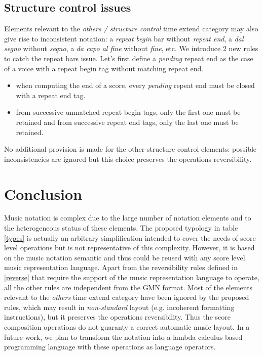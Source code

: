 \documentclass{article}
\begin{document}
\subsection{Structure control issues} \label{sc}
Elements relevant to the \emph{others / structure control} time extend category may also give rise to inconsistent notation: a \emph{repeat begin} bar without \emph{repeat end}, a \emph{dal segno} without \emph{segno}, a \emph{da capo al fine} without \emph{fine}, etc. We introduce 2 new rules to catch the repeat bars issue. Let's first define a \emph{pending} repeat end as the case of a voice with a repeat begin tag without matching repeat end.
\begin{itemize}
\item when computing the end of a score, every \emph{pending} repeat end must be closed with a repeat end tag.
\item from successive unmatched repeat begin tags, only the first one must be retained and from successive repeat end tags, only the last one must be retained.
\end{itemize}
No additional provision is made for the other structure control elements: possible inconsistencies are ignored but this choice preserves the operations reversibility.

\section{Conclusion}
Music notation is complex due to the large number of notation elements and to the heterogeneous status of these elements. The proposed typology in table \ref{types} is actually an arbitrary simplification intended to cover the needs of score level operations but is not representative of this complexity. However, it is based on the music notation semantic and thus could be reused with any score level music representation language. Apart from the reversibility rules defined in \ref{reverse} that require the support of the music representation language to operate, all the other rules are independent from the GMN format.
Most of the elements relevant to the \emph{others} time extend category have been ignored by the proposed rules, which may result in \emph{non-standard} layout (e.g. incoherent formatting instructions), but it preserves the operations reversibility. Thus the score composition operations do not guaranty a correct automatic music layout. 
In a future work, we plan to transform the notation into a lambda calculus based programming language \cite{Orlarey:94} with these operations as language operators.



\end{document}
